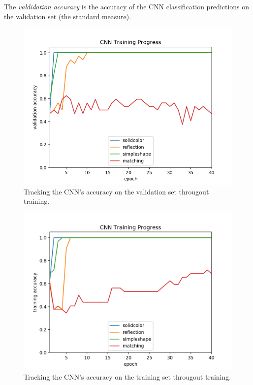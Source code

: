 \documentclass{article}
\renewcommand{\it}{\textit}
\begin{document}
The \it{valdidation accuracy} is the accuracy of the CNN classification predictions on the validation set (the standard measure).

\begin{figure}[ht]
\label{fig:cnn-validation-results}
\centering
\includegraphics[width=\textwidth]{cnn-validation-results.png}
\caption{Tracking the CNN's accuracy on the validation set througout training.}
\end{figure}

\begin{figure}[ht]
\label{fig:cnn-training-results}
\centering
\includegraphics[width=\textwidth]{cnn-training-results.png}
\caption{Tracking the CNN's accuracy on the training set througout training.}
\end{figure}
\end{document}
